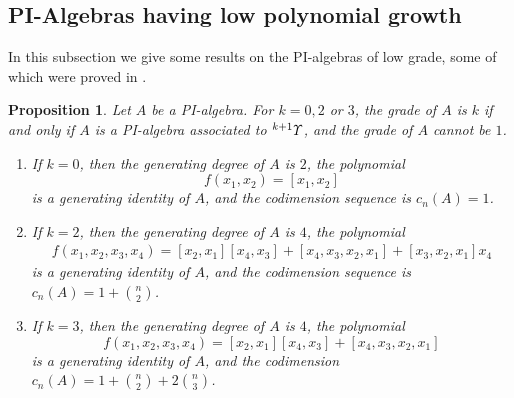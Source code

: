 \documentclass{amsart}
\newtheorem{prop}[thm]{Proposition}
\theoremstyle{definition}
\theoremstyle{remark}
\numberwithin{equation}{section}
\newcommand{\up}[1]{{^{#1}{\it \!\Upsilon}}}
\begin{document}
\subsection{PI-Algebras having low polynomial growth}
\label{yysec5.2}

In this subsection we give some results on the PI-algebras of 
low grade, some of which were proved in \cite{BYZ, GMZ, OV}.

\begin{prop}
\label{yypro5.6}
Let $A$ be a PI-algebra. For $k=0, 2$ or $3$, the 
grade of $A$ is $k$ if and only if $A$ is a PI-algebra 
associated to $\up{k+1}$, and the grade of $A$ cannot 
be $1$. 
\begin{enumerate}
\item[(1)] 
If $k=0$, then the generating degree of $A$ is $2$, the 
polynomial 
\[f(x_1, x_2)=[x_1, x_2]\] 
is a generating identity of $A$, and the codimension sequence 
is $c_n(A)=1$. 
\item[(2)] 
If $k=2$, then the generating degree of $A$ is $4$, the 
polynomial 
\begin{align*}
f(x_1, x_2, x_3, x_4)
=[x_2, x_1][x_4, x_3]+[x_4, x_3, x_2, x_1]+[x_3, x_2, x_1]x_4
\end{align*}
is a generating identity of $A$, and the codimension sequence 
is $c_n(A)=1+{n\choose 2}$.
\item[(3)] 
If $k=3$, then the generating degree of $A$ is $4$, the polynomial
\[f(x_1, x_2, x_3, x_4)
=[x_2, x_1][x_4, x_3]+[x_4, x_3, x_2, x_1]\]
is a generating identity of $A$, and the codimension 
$c_n(A)=1+{n\choose 2}+2{n\choose 3}$.
\end{enumerate}
\end{prop}
\end{document}
